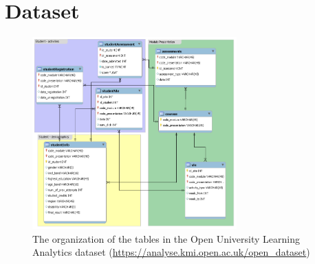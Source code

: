 \documentclass{article}
\begin{document}
\section{Dataset}

\begin{figure}[h!]
\centering
\includegraphics[width=0.7\textwidth]{database.png}
\caption{\label{fig:dataset}The organization of the tables in the Open University Learning Analytics dataset (\url{https://analyse.kmi.open.ac.uk/open_dataset})}
\end{figure}
\end{document}

